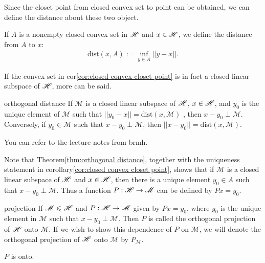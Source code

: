 Since the closet point from closed convex set to point can be obtained, we can define the distance about these two object.

\begin{definition}{}{}
    If $A$ is a nonempty closed convex set in $\mathscr{H}$ and $x\in \mathscr{H}$, we define the distance from $A$ to $x$:
    \begin{align*}
        \text{dist}(x,A):= \inf_{y\in A}||y-x||.
    \end{align*}
\end{definition}


If the convex set in cor\ref{cor:closed convex closet point} is in fact a closed linear subspace 
of $\mathscr{H}$, more can be said.

\begin{theorem}{}{orthogonal distance}
    If $\mathscr{M}$ is a closed linear subspace of $\mathscr{H}$, $x\in \mathscr{H}$, and $y_0$ is the unique element of $\mathscr{M}$ such that $||y_0-x|| =\text{dist}(x,\mathscr{M})$ , then $x-y_0\perp \mathscr{M}$. 
    Conversely, if $y_0\in\mathscr{M}$ such that $x-y_0\perp\mathscr{M}$, then $||x-y_0||=\text{dist}(x,\mathscr{M})$.
\end{theorem}

\begin{proofsolution}
    You can refer to the lecture notes from brmh.
\end{proofsolution}



Note that Theorem\ref{thm:orthogonal distance}, together with the uniqueness statement in 
corollary\ref{cor:closed convex closet point}, shows that if $\mathscr{M}$ is a closed linear subspace of $\mathscr{H}$ and $x\in \mathscr{H}$, 
then there is a unique element $y_0\in A$ such that $x -y_0\perp \mathscr{M}$. Thus a function 
$P: \mathscr{H}\rightarrow \mathscr{M}$ can be defined by $Px = y_0$.


\begin{definition}{}{projection}
    If $\mathscr{M}\leqslant \mathscr{H}$ and $P: \mathscr{H}\rightarrow \mathscr{M}$ given by $Px = y_0$, 
    where $y_0$ is the unique element in $\mathscr{M}$ such that $x -y_0\perp \mathscr{M}$.
    Then $P$ is called the orthogonal projection of $\mathscr{H}$ onto $\mathscr{M}$. If we wish to show this dependence of $P$ on $\mathscr{M}$, 
we will denote the orthogonal projection of $\mathscr{H}$ onto $\mathscr{M}$ by $P_{\mathscr{M}}$.
\end{definition}
\begin{remark}
    $P$ is onto.
\end{remark}


